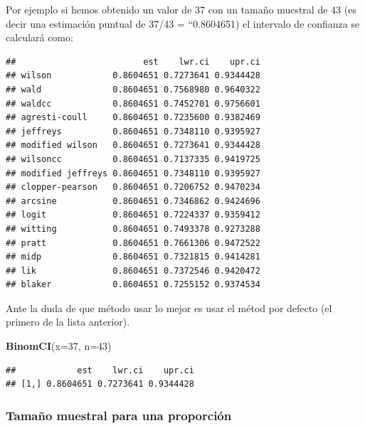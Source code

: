 \documentclass[
]{article}
\newenvironment{Shaded}{\begin{snugshade}}{\end{snugshade}}
\newcommand{\AttributeTok}[1]{\textcolor[rgb]{0.13,0.29,0.53}{#1}}
\newcommand{\CommentTok}[1]{\textcolor[rgb]{0.56,0.35,0.01}{\textit{#1}}}
\newcommand{\DecValTok}[1]{\textcolor[rgb]{0.00,0.00,0.81}{#1}}
\newcommand{\FunctionTok}[1]{\textcolor[rgb]{0.13,0.29,0.53}{\textbf{#1}}}
\newcommand{\NormalTok}[1]{#1}
\newcommand{\SpecialCharTok}[1]{\textcolor[rgb]{0.81,0.36,0.00}{\textbf{#1}}}
\begin{document}
Por ejemplo si hemos obtenido un valor de 37 con un tamaño muestral de 43 (es decir una estimación puntual de 37/43 = ``0.8604651) el intervalo de confianza se calculará como:

\begin{Shaded}
\end{Shaded}

\begin{verbatim}
##                         est    lwr.ci    upr.ci
## wilson            0.8604651 0.7273641 0.9344428
## wald              0.8604651 0.7568980 0.9640322
## waldcc            0.8604651 0.7452701 0.9756601
## agresti-coull     0.8604651 0.7235600 0.9382469
## jeffreys          0.8604651 0.7348110 0.9395927
## modified wilson   0.8604651 0.7273641 0.9344428
## wilsoncc          0.8604651 0.7137335 0.9419725
## modified jeffreys 0.8604651 0.7348110 0.9395927
## clopper-pearson   0.8604651 0.7206752 0.9470234
## arcsine           0.8604651 0.7346862 0.9424696
## logit             0.8604651 0.7224337 0.9359412
## witting           0.8604651 0.7493378 0.9273288
## pratt             0.8604651 0.7661306 0.9472522
## midp              0.8604651 0.7321815 0.9414281
## lik               0.8604651 0.7372546 0.9420472
## blaker            0.8604651 0.7255152 0.9374534
\end{verbatim}

Ante la duda de que método usar lo mejor es usar el métod por defecto (el primero de la lista anterior).

\begin{Shaded}
\begin{Highlighting}[]
\FunctionTok{BinomCI}\NormalTok{(}\AttributeTok{x=}\DecValTok{37}\NormalTok{, }\AttributeTok{n=}\DecValTok{43}\NormalTok{) }
\end{Highlighting}
\end{Shaded}

\begin{verbatim}
##            est    lwr.ci    upr.ci
## [1,] 0.8604651 0.7273641 0.9344428
\end{verbatim}

\subsubsection{Tamaño muestral para una proporción}\label{tamauxf1o-muestral-para-una-proporciuxf3n}
\end{document}
